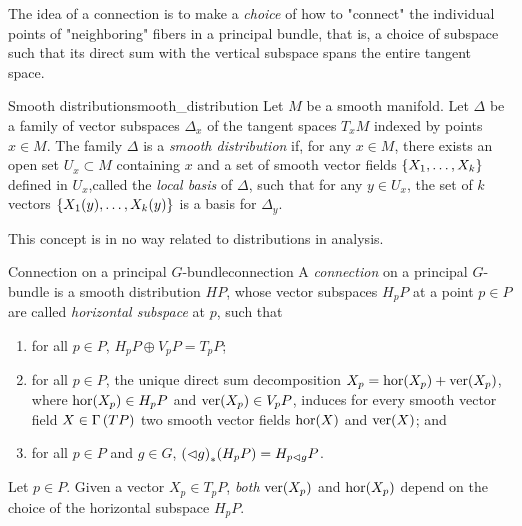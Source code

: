 The idea of a connection is to make a \emph{choice} of how to "connect" the individual points of "neighboring" fibers in a principal bundle, that is, a choice of subspace such that its direct sum with the vertical subspace spans the entire tangent space.
\begin{definition}{Smooth distribution}{smooth_distribution}
    Let \(M\) be a smooth manifold. Let \(\Delta\) be a family of vector subspaces \(\Delta_x\) of the tangent spaces \(T_xM\) indexed by points \(x \in M\). The family \(\Delta\) is a \emph{smooth distribution} if, for any \(x \in M\), there exists an open set \(U_x \subset M\) containing \(x\) and a set of smooth vector fields \(\{X_1, \dots, X_k\}\) defined in \(U_x\),called the \emph{local basis} of \(\Delta\), such that for any \(y \in U_x\), the set of \(k\) vectors \(\{X_1(y), \dots, X_k(y)\}\) is a basis for \(\Delta_y\).
\end{definition}
\begin{remark}
    This concept is in no way related to distributions in analysis.
\end{remark}
\begin{definition}{Connection on a principal \(G\)-bundle}{connection}
    A \emph{connection} on a principal \(G\)-bundle  is a smooth distribution \(HP\), whose vector subspaces \(H_pP\) at a point \(p \in P\) are called \emph{horizontal subspace} at \(p\), such that
    \begin{enumerate}[label=(\alph*)]
        \item for all \(p \in P\), \(H_pP \oplus V_pP = T_pP\);
        \item for all \(p \in P\), the unique direct sum decomposition \(X_p = \operatorname{hor}(X_p) + \operatorname{ver}(X_p)\), where \(\operatorname{hor}(X_p) \in H_pP\) and \(\operatorname{ver}(X_p) \in V_pP\), induces for every smooth vector field \(X \in \Gamma\left(TP\right)\) two smooth vector fields \(\operatorname{hor}(X)\) and \(\operatorname{ver}(X)\); and
        \item for all \(p \in P\) and \(g \in G\), \({(\mathbin{\vartriangleleft} g)}_{\ast{}}{(H_pP)} = H_{p\mathbin{\vartriangleleft} g}P\).
    \end{enumerate}
\end{definition}
\begin{remark}
    Let \(p \in P\). Given a vector \(X_p \in T_pP\), \emph{both} \(\operatorname{ver}(X_p)\) and \(\operatorname{hor}(X_p)\) depend on the choice of the horizontal subspace \(H_pP\).
\end{remark}

